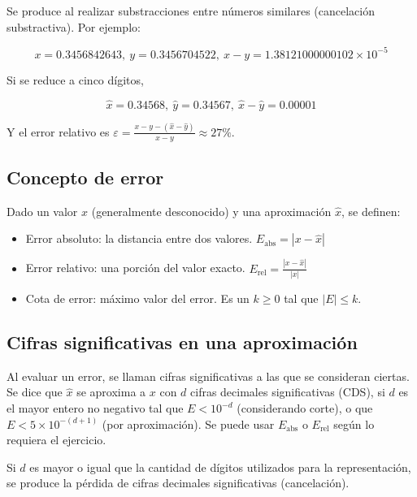 \documentclass{article}
\begin{document}
Se produce al realizar substracciones entre números similares (cancelación
substractiva). Por ejemplo: 

\begin{equation*}
    x = 0.3456842643,\ y = 0.3456704522,\ x - y = 1.38121000000102\times10^{-5}
\end{equation*}

Si se reduce a cinco dígitos,

\begin{equation*}
    \hat{x} = 0.34568,\ \hat{y} = 0.34567,\ \hat{x} - \hat{y} = 0.00001
\end{equation*}

Y el error relativo es 
$\varepsilon = \frac{x - y - (\hat{x} - \hat{y})}{x-y}\approx27\%$.

\subsection{Concepto de error}

Dado un valor $x$ (generalmente desconocido) y una aproximación $\hat{x}$, se 
definen:

\begin{itemize}
    \item Error absoluto: la distancia entre dos valores.
        $E_{\text{abs}} = |x-\hat{x}|$
    \item Error relativo: una porción del valor exacto.
        $E_{\text{rel}} = \frac{|x-\hat{x}|}{|x|}$
    \item Cota de error: máximo valor del error. Es un $k\geq0$ tal que 
        $|E|\leq k$.
\end{itemize}

\subsection{Cifras significativas en una aproximación}

Al evaluar un error, se llaman cifras significativas a las que se consideran
ciertas. Se dice que $\hat{x}$ se aproxima a $x$ con $d$ cifras decimales
significativas (CDS), si $d$ es el mayor entero no negativo tal que 
$E<10^{-d}$ (considerando corte), o que $E<5\times10^{-(d+1)}$ (por 
aproximación). Se puede usar $E_{\text{abs}}$ o $E_{\text{rel}}$ según lo 
requiera el ejercicio.

Si $d$ es mayor o igual que la cantidad de dígitos utilizados para la 
representación, se produce la pérdida de cifras decimales significativas 
(cancelación).
\end{document}
